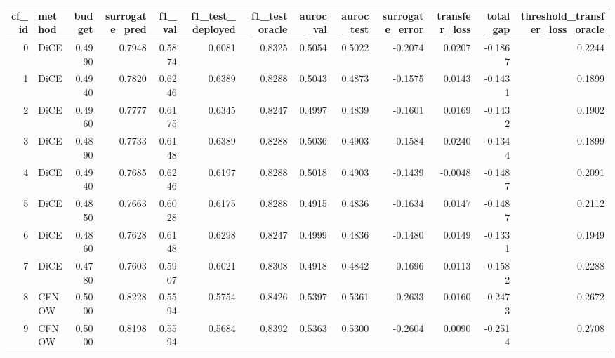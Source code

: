 \begin{tabular}{rlrrrrrrrrrrr}
\toprule
 cf\_id & method &  budget &  surrogate\_pred &  f1\_val &  f1\_test\_deployed &  f1\_test\_oracle &  auroc\_val &  auroc\_test &  surrogate\_error &  transfer\_loss &  total\_gap &  threshold\_transfer\_loss\_oracle \\
\midrule
     0 &   DiCE &  0.4990 &          0.7948 &  0.5874 &            0.6081 &          0.8325 &     0.5054 &      0.5022 &          -0.2074 &         0.0207 &    -0.1867 &                          0.2244 \\
     1 &   DiCE &  0.4940 &          0.7820 &  0.6246 &            0.6389 &          0.8288 &     0.5043 &      0.4873 &          -0.1575 &         0.0143 &    -0.1431 &                          0.1899 \\
     2 &   DiCE &  0.4960 &          0.7777 &  0.6175 &            0.6345 &          0.8247 &     0.4997 &      0.4839 &          -0.1601 &         0.0169 &    -0.1432 &                          0.1902 \\
     3 &   DiCE &  0.4890 &          0.7733 &  0.6148 &            0.6389 &          0.8288 &     0.5036 &      0.4903 &          -0.1584 &         0.0240 &    -0.1344 &                          0.1899 \\
     4 &   DiCE &  0.4940 &          0.7685 &  0.6246 &            0.6197 &          0.8288 &     0.5018 &      0.4903 &          -0.1439 &        -0.0048 &    -0.1487 &                          0.2091 \\
     5 &   DiCE &  0.4850 &          0.7663 &  0.6028 &            0.6175 &          0.8288 &     0.4915 &      0.4836 &          -0.1634 &         0.0147 &    -0.1487 &                          0.2112 \\
     6 &   DiCE &  0.4860 &          0.7628 &  0.6148 &            0.6298 &          0.8247 &     0.4999 &      0.4836 &          -0.1480 &         0.0149 &    -0.1331 &                          0.1949 \\
     7 &   DiCE &  0.4780 &          0.7603 &  0.5907 &            0.6021 &          0.8308 &     0.4918 &      0.4842 &          -0.1696 &         0.0113 &    -0.1582 &                          0.2288 \\
     8 &  CFNOW &  0.5000 &          0.8228 &  0.5594 &            0.5754 &          0.8426 &     0.5397 &      0.5361 &          -0.2633 &         0.0160 &    -0.2473 &                          0.2672 \\
     9 &  CFNOW &  0.5000 &          0.8198 &  0.5594 &            0.5684 &          0.8392 &     0.5363 &      0.5300 &          -0.2604 &         0.0090 &    -0.2514 &                          0.2708 \\

\end{tabular}
